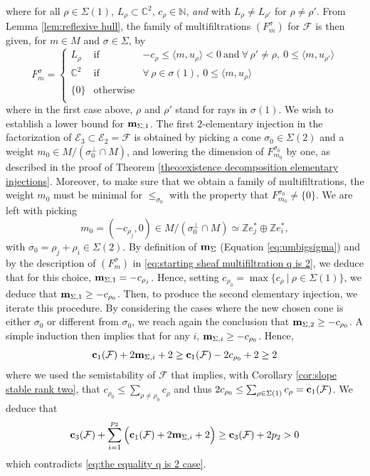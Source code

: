 \documentclass[a4paper,10pt]{amsart}
\theoremstyle{plain}{
    \newtheorem{theorem}{Theorem}[section]
    \newtheorem{lemma}[theorem]{Lemma}
    \newtheorem{corollary}[theorem]{Corollary}
    \newtheorem{proposition}[theorem]{Proposition}
    \newtheorem{conjecture}[theorem]{Conjecture}
}
\theoremstyle{definition}{
    \newtheorem{definition}[theorem]{Definition}
    \newtheorem{defn-thm}[theorem]{Definition-Theorem}
    \newtheorem{example}[theorem]{Example}
    \newtheorem{notation}[theorem]{Notation}
}
\theoremstyle{remark}{
    \newtheorem{remark}[theorem]{Remark}
    \newtheorem{problem}[theorem]{Problem}
    \newtheorem{question}[theorem]{Question}
}
\def\um{{\bf m}}
\def\uc{{\bf c}}
\def\cF{\mathcal{F}}
\def\cE{\mathcal{E}}
\def\Z{\mathbb{Z}}
\def\N{\mathbb{N}}
\def\C{\mathbb{C}}
\begin{document}
 where  for all $\rho\in\Sigma(1)$, $L_\rho\subset\C^2$, $c_\rho\in\N$, {\it and} with $L_\rho\neq L_{\rho'}$ for $\rho\neq\rho'$. 
 From Lemma \ref{lem:reflexive hull}, the family of multifiltrations $(F^\sigma_m)$ for $\cF$ is then given, for $m\in M$ and $\sigma\in\Sigma$, by
\begin{equation}
  \label{eq:starting sheaf multifiltration q is 2}
 F^\sigma_m=\left\{
 \begin{array}{ccc}
                 L_\rho & \mathrm{ if } & -c_\rho\leq \langle m, u_\rho \rangle < 0\:\mathrm{ and }\: \forall\,\rho'\neq \rho, \: 0\leq \langle m, u_{\rho'} \rangle\\
\C^2 & \mathrm{ if } &\forall\, \rho\in\sigma(1),\: 0\leq  \langle m, u_\rho \rangle \\

                  \lbrace 0 \rbrace & \mathrm{ otherwise } & \\
                  \end{array}
                  \right.
 \end{equation}
where in the first case above, $\rho$ and $\rho'$ stand for rays in $\sigma(1)$. We wish to establish a lower bound for $\um_{\Sigma,1}$. The first $2$-elementary injection in the factorization of $\cE_3\subset\cE_2=\cF$ is obtained by picking a cone $\sigma_0\in\Sigma(2)$ and a weight $m_0\in M/(\sigma_0^\perp\cap M)$, and lowering the dimension of $F^{\sigma_0}_{m_0}$ by one, as described in the proof of Theorem \ref{theo:existence decomposition elementary injections}. Moreover, to make sure that we obtain a family of multifiltrations, the weight $m_0$ must be minimal for $\leq_{\sigma_0}$ with the property that $F^{\sigma_0}_{m_0}\neq\lbrace 0\rbrace$.  We are left with picking $$m_0=(-c_{\rho_j},0)\in M/(\sigma_0^\perp\cap M)\simeq \Z e_j^*\oplus\Z e_i^*,$$ with $\sigma_0=\rho_j+\rho_i\in\Sigma(2)$. By definition of $\um_\Sigma$ (Equation \eqref{eq:umbigsigma}) and by the description of $(F^\sigma_m)$ in \eqref{eq:starting sheaf multifiltration q is 2}, we deduce that for this choice, $\um_{\Sigma,1}=-c_{\rho_j}$. Hence, setting $c_{\rho_0}=\max\lbrace c_\rho\:\vert\: \rho\in\Sigma(1)\rbrace$, we deduce that
$\um_{\Sigma,1}\geq -c_{\rho_0}$.
Then, to produce the second elementary injection, we iterate this procedure. By considering the cases where the new chosen cone is either $\sigma_0$ or different from $\sigma_0$, we reach again the conclusion that $
\um_{\Sigma,2}\geq -c_{\rho_0}$. A simple induction then implies that for any $i$, $\um_{\Sigma,i}\geq -c_{\rho_0}$. Hence,
\begin{equation*}
 \uc_1(\cF)+2\um_{\Sigma,i}+2 \geq \uc_1(\cF)-2 c_{\rho_0}+2\geq 2
\end{equation*}
where we used the semistability of $\cF$ that implies, with Corollary \ref{cor:slope stable rank two}, that $c_{\rho_0}\leq \sum_{\rho\neq \rho_0} c_\rho$ and thus $2c_{\rho_0} \leq \sum_{\rho\in\Sigma(1)} c_\rho =\uc_1(\cF)$. We deduce that
$$
\uc_3(\cF)+\sum_{i=1}^{p_2}\Big(\uc_1(\cF)+2\um_{\Sigma,i}+2\Big) \geq \uc_3(\cF)+2p_2>0
$$
which contradicts \eqref{eq:the equality q is 2 case}.
\end{document}
